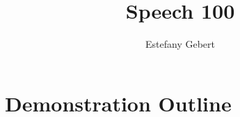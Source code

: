 \documentclass[]{article}
\title{Speech 100}
\author{Estefany Gebert}
\begin{document}
\maketitle 


\section{Demonstration Outline}
\end{document}
